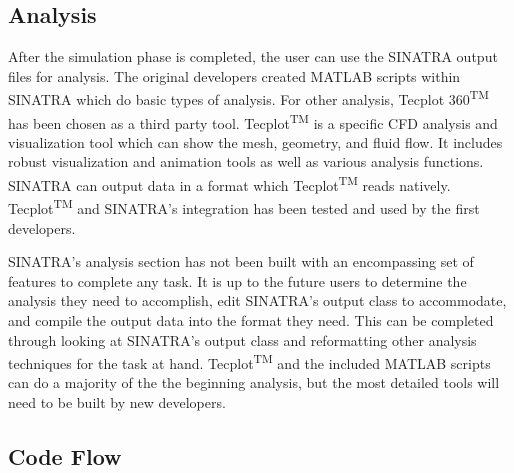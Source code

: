 

\subsection{Analysis}


 After the simulation phase is completed, the user can use the SINATRA output files for analysis. The original developers created MATLAB scripts within SINATRA which do basic types of analysis. For other analysis, Tecplot 360\textsuperscript{TM} \cite{tecplot} has been chosen as a third party tool. Tecplot\textsuperscript{TM} is a specific CFD analysis and visualization tool which can show the mesh, geometry, and fluid flow. It includes robust visualization and animation tools as well as various analysis functions. SINATRA can output data in a format which Tecplot\textsuperscript{TM} reads natively. Tecplot\textsuperscript{TM} and SINATRA's integration has been tested and used by the first developers.\par
 \indent SINATRA's analysis section has not been built with an encompassing set of features to complete any task. It is up to the future users to determine the analysis they need to accomplish, edit SINATRA's output class to accommodate, and compile the output data into the format they need. This can be completed through looking at SINATRA's output class and reformatting other analysis techniques for the task at hand. Tecplot\textsuperscript{TM} and the included MATLAB scripts can do a majority of the the beginning analysis, but the most detailed tools will need to be built by new developers. 


\subsection{Code Flow} %
 
 
